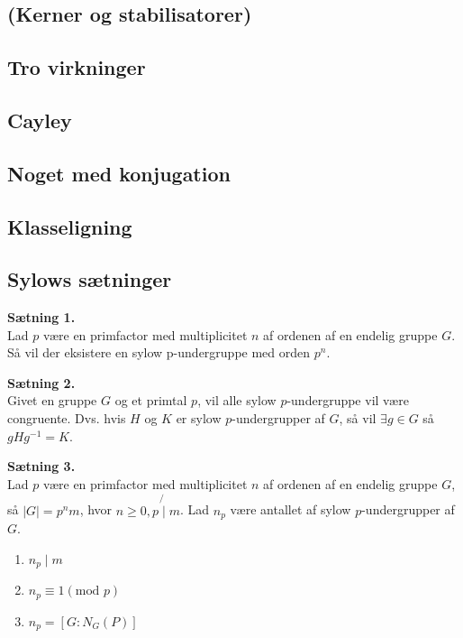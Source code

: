\documentclass[11pt]{article}
\begin{document}
\subsection*{(Kerner og stabilisatorer)}
\subsection*{Tro virkninger}
\subsection*{Cayley}
\subsection*{Noget med konjugation}
\subsection*{Klasseligning}
\subsection*{Sylows sætninger}
\textbf{Sætning 1.}\\
Lad $p$ være en primfactor med multiplicitet $n$ af ordenen af en endelig gruppe $G$. Så vil der eksistere en sylow p-undergruppe med orden $p^n$.

\textbf{Sætning 2.}\\
Givet en gruppe $G$ og et primtal $p$, vil alle sylow $p$-undergruppe vil være congruente. Dvs. hvis $H$ og $K$ er sylow $p$-undergrupper af $G$, så vil $\exists{g \in G}$ så $gHg^{-1} = K$.

\textbf{Sætning 3.}\\
Lad $p$ være en primfactor med multiplicitet $n$ af ordenen af en endelig gruppe $G$, så $|G| = p^n m$, hvor $n \geq 0, p \not{\mid} m$. Lad $n_p$ være antallet af sylow $p$-undergrupper af $G$.
\begin{enumerate}
  \item $n_p \mid m$
  \item $n_p \equiv 1 (\text{mod } p)$
  \item $n_p = [G : N_G(P)]$
\end{enumerate}
\end{document}
